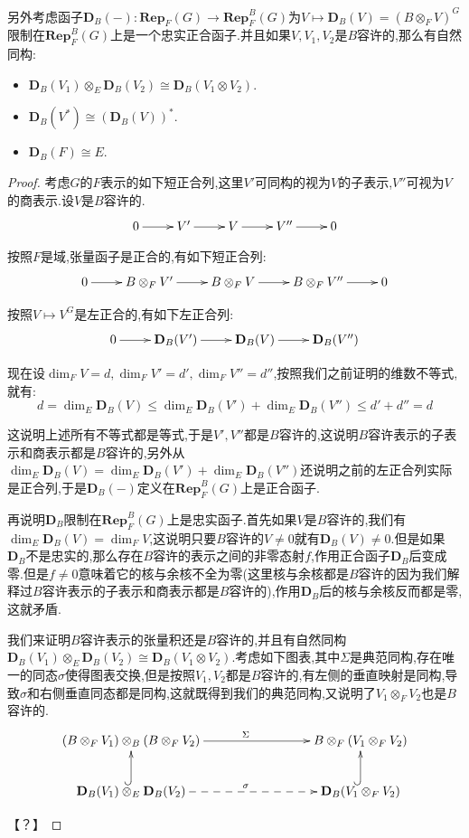 \begin{enumerate}
	另外考虑函子$\textbf{D}_B(-):\textbf{Rep}_F(G)\to\textbf{Rep}_F^B(G)$为$V\mapsto\textbf{D}_B(V)=(B\otimes_FV)^G$限制在$\textbf{Rep}_F^B(G)$上是一个忠实正合函子.并且如果$V,V_1,V_2$是$B$容许的,那么有自然同构:
	\begin{itemize}
		\item $\textbf{D}_B(V_1)\otimes_E\textbf{D}_B(V_2)\cong\textbf{D}_B(V_1\otimes V_2)$.
		\item $\textbf{D}_B(V^*)\cong(\textbf{D}_B(V))^*$.
		\item $\textbf{D}_B(F)\cong E$.
	\end{itemize}
	\begin{proof}
		
		考虑$G$的$F$表示的如下短正合列,这里$V'$可同构的视为$V$的子表示,$V''$可视为$V$的商表示.设$V$是$B$容许的.
		$$\xymatrix{0\ar[r]&V'\ar[r]&V\ar[r]&V''\ar[r]&0}$$
		
		按照$F$是域,张量函子是正合的,有如下短正合列:
		$$\xymatrix{0\ar[r]&B\otimes_FV'\ar[r]&B\otimes_FV\ar[r]&B\otimes_FV''\ar[r]&0}$$
		
		按照$V\mapsto V^G$是左正合的,有如下左正合列:
		$$\xymatrix{0\ar[r]&\textbf{D}_B(V')\ar[r]&\textbf{D}_B(V)\ar[r]&\textbf{D}_B(V'')}$$
		
		现在设$\dim_FV=d,\dim_FV'=d',\dim_FV''=d''$,按照我们之前证明的维数不等式,就有:
		$$d=\dim_E\textbf{D}_B(V)\le\dim_E\textbf{D}_B(V')+\dim_E\textbf{D}_B(V'')\le d'+d''=d$$
		
		这说明上述所有不等式都是等式,于是$V',V''$都是$B$容许的,这说明$B$容许表示的子表示和商表示都是$B$容许的,另外从$\dim_E\textbf{D}_B(V)=\dim_E\textbf{D}_B(V')+\dim_E\textbf{D}_B(V'')$还说明之前的左正合列实际是正合列,于是$\textbf{D}_B(-)$定义在$\textbf{Rep}_F^B(G)$上是正合函子.
		
		\qquad
		
		再说明$\textbf{D}_B$限制在$\textbf{Rep}_F^B(G)$上是忠实函子.首先如果$V$是$B$容许的,我们有$\dim_E\textbf{D}_B(V)=\dim_FV$,这说明只要$B$容许的$V\not=0$就有$\textbf{D}_B(V)\not=0$.但是如果$\textbf{D}_B$不是忠实的,那么存在$B$容许的表示之间的非零态射$f$,作用正合函子$\textbf{D}_B$后变成零.但是$f\not=0$意味着它的核与余核不全为零(这里核与余核都是$B$容许的因为我们解释过$B$容许表示的子表示和商表示都是$B$容许的),作用$\textbf{D}_B$后的核与余核反而都是零,这就矛盾.
		
		\qquad
		
		我们来证明$B$容许表示的张量积还是$B$容许的,并且有自然同构$\textbf{D}_B(V_1)\otimes_E\textbf{D}_B(V_2)\cong\textbf{D}_B(V_1\otimes V_2)$.考虑如下图表,其中$\Sigma$是典范同构,存在唯一的同态$\sigma$使得图表交换,但是按照$V_1,V_2$都是$B$容许的,有左侧的垂直映射是同构,导致$\sigma$和右侧垂直同态都是同构,这就既得到我们的典范同构,又说明了$V_1\otimes_FV_2$也是$B$容许的.
		$$\xymatrix{(B\otimes_FV_1)\otimes_B(B\otimes_FV_2)\ar[rrr]^{\Sigma}&&&B\otimes_F(V_1\otimes_FV_2)\\\textbf{D}_B(V_1)\otimes_E\textbf{D}_B(V_2)\ar@{-->}[rrr]^{\sigma}\ar@{^{(}->}[u]&&&\textbf{D}_B(V_1\otimes_FV_2)\ar@{^{(}->}[u]}$$
		
		【？】
	\end{proof}
\end{enumerate}

